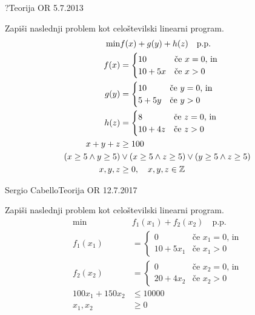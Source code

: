 \begin{naloga}{?}{Teorija OR 5.7.2013}
\begin{vprasanje}[fgh]
Zapiši naslednji problem kot celoštevilski linearni program.
\begin{align*}
\min & f(x) + g(y) + h(z) \quad \text{p.p.} \\
f(x) &= \begin{cases}
        10      & \text{če $x = 0$, in} \\
        10 + 5x & \text{če $x > 0$}
        \end{cases} \\
g(y) &= \begin{cases}
        10     & \text{če $y = 0$, in} \\
        5 + 5y & \text{če $y > 0$}
        \end{cases} \\
h(z) &= \begin{cases}
        8       & \text{če $z = 0$, in} \\
        10 + 4z & \text{če $z > 0$}
        \end{cases} \\
x + y + z &\ge 100 \\
      (x \ge 5 \land y \ge 5)
&\lor (x \ge 5 \land z \ge 5)
 \lor (y \ge 5 \land z \ge 5) \\
x, y, z &\ge 0, \quad x, y, z \in \mathbb{Z}
\end{align*}
\end{vprasanje}
\begin{odgovor}
\end{odgovor}
\end{naloga}


\begin{naloga}{Sergio Cabello}{Teorija OR 12.7.2017}
\begin{vprasanje}[f1f2]
Zapiši naslednji problem kot celoštevilski linearni program.
\begin{align*}
\min & f_1(x_1) + f_2(x_2) \quad \text{p.p.} \\
f_1(x_1) &= \begin{cases}
            0         & \text{če $x_1 = 0$, in} \\
            10 + 5x_1 & \text{če $x_1 > 0$}
            \end{cases} \\
f_2(x_2) &= \begin{cases}
            0         & \text{če $x_2 = 0$, in} \\
            20 + 4x_2 & \text{če $x_2 > 0$}
            \end{cases} \\
100x_1 + 150x_2 &\le 10000 \\
x_1, x_2 &\ge 0
\end{align*}
\end{vprasanje}
\begin{odgovor}
\end{odgovor}
\end{naloga}


